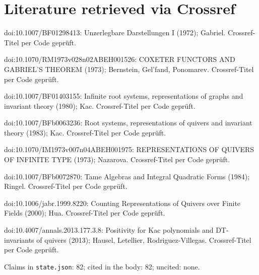 \documentclass[11pt]{article}
\theoremstyle{definition}\newtheorem{definition}[theorem]{Definition}\newtheorem{remark}[theorem]{Remark}\newtheorem{observation}[theorem]{Numerical observation}
\begin{document}
\section{Literature retrieved via Crossref}
\noindent doi:10.1007/BF01298413: Unzerlegbare Darstellungen I (1972); Gabriel. Crossref-Titel per Code geprüft.\par
\noindent doi:10.1070/RM1973v028n02ABEH001526: COXETER FUNCTORS AND GABRIEL'S THEOREM (1973); Bernstein, Gel'fand, Ponomarev. Crossref-Titel per Code geprüft.\par
\noindent doi:10.1007/BF01403155: Infinite root systems, representations of graphs and invariant theory (1980); Kac. Crossref-Titel per Code geprüft.\par
\noindent doi:10.1007/BFb0063236: Root systems, representations of quivers and invariant theory (1983); Kac. Crossref-Titel per Code geprüft.\par
\noindent doi:10.1070/IM1973v007n04ABEH001975: REPRESENTATIONS OF QUIVERS OF INFINITE TYPE (1973); Nazarova. Crossref-Titel per Code geprüft.\par
\noindent doi:10.1007/BFb0072870: Tame Algebras and Integral Quadratic Forms (1984); Ringel. Crossref-Titel per Code geprüft.\par
\noindent doi:10.1006/jabr.1999.8220: Counting Representations of Quivers over Finite Fields (2000); Hua. Crossref-Titel per Code geprüft.\par
\noindent doi:10.4007/annals.2013.177.3.8: Positivity for Kac polynomials and DT-invariants of quivers (2013); Hausel, Letellier, Rodriguez-Villegas. Crossref-Titel per Code geprüft.\par
\par\medskip\noindent Claims in \texttt{state.json}: 82; cited in the body: 82; uncited: none.
\end{document}
